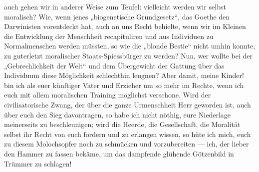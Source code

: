 auch gehen wir in anderer Weise zum Teufel: vielleicht werden wir selbst moralisch? Wie, wenn jenes „biogenetische Grundgesetz“, das Goethe den Darwinisten vorentdeckt hat, auch an uns Recht behielte, wenn wir im Kleinen die Entwicklung der Menschheit recapituliren und aus Individuen zu Normalmenschen werden müssten, so wie die „blonde Bestie“ nicht umhin konnte, zu guterletzt moralischer Staats-Spiessbürger zu werden? Nun, wer wollte bei der „Gebrechlichkeit der Welt“ und dem Übergewicht der Gattung über das Individuum diese Möglichkeit schlechthin leugnen? Aber damit, meine Kinder! bin ich als euer künftiger Vater und Erzieher um so mehr im Rechte, wenn ich euch mit allem moralischen Training möglichst verschone. Wird der civilisatorische Zwang, der über die ganze Urmenschheit Herr geworden ist, auch über euch den Sieg davontragen, so habe ich nicht nöthig, eure Niederlage meinerseits zu beschleunigen; wird die Heerde, die Gesellschaft, die Moralität selbst ihr Recht von euch fordern und zu erlangen wissen, so hüte ich mich, euch zu diesem Molochsopfer noch zu schmücken und vorzubereiten — ich, der lieber den Hammer zu fassen bekäme, um das dampfende glühende Götzenbild in Trümmer zu schlagen!
\par

